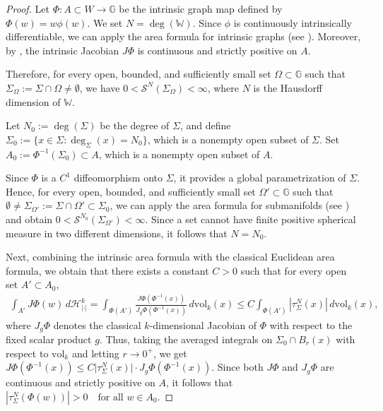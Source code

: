 \documentclass[dvipsnames]{amsart}
\theoremstyle{definition}
\theoremstyle{definition}
\numberwithin{equation}{section}
\newcommand{\W}{\mathbb{W}}
\begin{document}
\begin{proof}
Let $\Phi: A \subset W \to \mathbb G$ be the intrinsic graph map defined by $\Phi(w) = w  \phi(w)$.
We set $N=\deg(\W)$.
Since $\phi$ is continuously intrinsically differentiable, we can apply the area formula for intrinsic graphs (see \cite[Theorem 1.2]{CorMag23pr}). Moreover, by \cite[Proposition 7.2]{CorMag23pr}, the intrinsic Jacobian $J\Phi$ is continuous and strictly positive on $A$.

Therefore, for every open, bounded, and sufficiently small set $\Omega \subset \mathbb G$ such that $\Sigma_\Omega := \Sigma \cap \Omega \neq \emptyset$, we have $
0 < \mathcal S^N(\Sigma_\Omega) < \infty$,
where $N$ is the Hausdorff dimension of $\W$.

Let $N_0 := \operatorname{deg}(\Sigma)$ be the degree of $\Sigma$, and define $\Sigma_0 := \{x \in \Sigma : \operatorname{deg}_\Sigma(x) = N_0\}$,
which is a nonempty open subset of $\Sigma$. Set
$A_0 := \Phi^{-1}(\Sigma_0) \subset A$,
which is a nonempty open subset of $A$.

Since $\Phi$ is a $C^1$ diffeomorphism onto $\Sigma$, it provides a global parametrization of $\Sigma$. Hence, for every open, bounded, and sufficiently small set $\Omega' \subset \mathbb G$ such that $\emptyset \neq \Sigma_{\Omega'} := \Sigma \cap \Omega' \subset \Sigma_0$, we can apply the area formula for submanifolds (see \cite[(1.4)]{Mag13Vit}) and obtain $0 < \mathcal S^{N_0}(\Sigma_{\Omega'}) < \infty$.
Since a set cannot have finite positive spherical measure in two different dimensions, it follows that $N=N_0$.

Next, combining the intrinsic area formula with the classical Euclidean area formula, we obtain that there exists a constant $C>0$ such that for every open set $A' \subset A_0$,
\begin{align*}
\int_{A'} J\Phi(w)\, d\mathcal H^k_{|\cdot|}
=
\int_{\Phi(A')} \frac{J\Phi(\Phi^{-1}(x))}{J_g\Phi(\Phi^{-1}(x))}\, d\mathrm{vol}_k(x)
\le
C \int_{\Phi(A')} |\tau_\Sigma^N(x)|\, d\mathrm{vol}_k(x),
\end{align*}
where $J_g\Phi$ denotes the classical $k$-dimensional Jacobian of $\Phi$ with respect to the fixed scalar product $g$. Thus, taking the averaged integrals on $\Sigma_0\cap B_r(x)$ with respect to $\mathrm{vol}_k$ and letting $r\to 0^+$, we get  $J\Phi(\Phi^{-1}(x))\le C\vert\tau_\Sigma^N(x)\vert\cdot J_g\Phi(\Phi^{-1}(x))$. 
Since both $J\Phi$ and $J_g\Phi$ are continuous and strictly positive on $A$, it follows that
$
|\tau_\Sigma^N(\Phi(w))| > 0 \quad \text{for all } w \in A_0$.


\end{proof}
\end{document}
